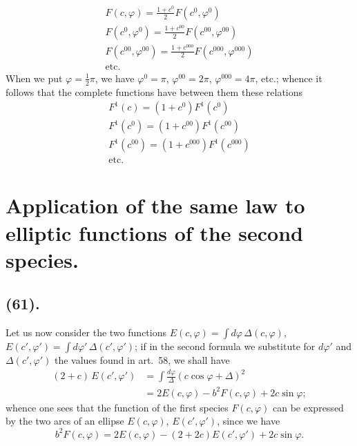 \documentclass{article}
\begin{document}
\[ \begin{gathered} F(c,\varphi)=\frac{1+c^{0}}{2}F(c^{0},\varphi^{0})\\ F(c^{0},\varphi^{0})=\frac{1+c^{00}}{2}F(c^{00},\varphi^{00})\\ F(c^{00},\varphi^{00})=\frac{1+c^{000}}{2}F(c^{000},\varphi^{000})\\ \text{etc.} \end{gathered} \]
When we put $\varphi=\frac{1}{2}\pi$, we have $\varphi^{0}=\pi$, $\varphi^{00}=2\pi$, $\varphi^{000}=4\pi$, etc.; whence it follows that the complete functions have between them these relations
\[ \begin{gathered} F^{1}(c)=(1+c^{0})F^{1}(c^{0})\\ F^{1}(c^{0})=(1+c^{00})F^{1}(c^{00})\\ F^{1}(c^{00})=(1+c^{000})F^{1}(c^{000})\\ \text{etc.} \end{gathered} \]

\section*{Application of the same law to elliptic functions of the second species.}

\subsection*{(61).}

Let us now consider the two functions $E(c,\varphi)=\displaystyle\int d\varphi\,\Delta(c,\varphi)$, $E(c',\varphi')=\displaystyle\int d\varphi'\,\Delta(c',\varphi')$; if in the second formula we substitute for $d\varphi'$ and $\Delta(c',\varphi')$ the values found in art.~58, we shall have
\[ \begin{aligned} (2+c)\,E(c',\varphi')&=\int\frac{d\varphi}{\Delta}(c\cos\varphi+\Delta)^{2}\\ &=2E(c,\varphi)-b^{2}F(c,\varphi)+2c\sin\varphi; \end{aligned} \]
whence one sees that the function of the first species $F(c,\varphi)$ can be expressed by the two arcs of an ellipse $E(c,\varphi)$, $E(c',\varphi')$, since we have
\[ b^{2}F(c,\varphi)=2E(c,\varphi)-(2+2c)E(c',\varphi')+2c\sin\varphi. \]
\end{document}
